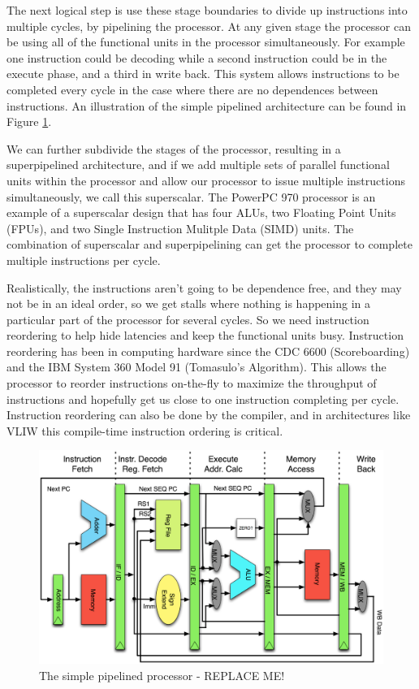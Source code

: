 \documentclass[12pt,twoside,letterpaper]{article}
\begin{document}
The next logical step is use these stage boundaries to divide up instructions into multiple cycles, by pipelining the processor. At any given stage the processor can be using all of the functional units in the processor simultaneously. For example one instruction could be decoding while a second instruction could be in the execute phase, and a third in write back. This system allows instructions to be completed every cycle in the case where there are no dependences between instructions. An illustration of the simple pipelined architecture can be found in Figure \ref{mips_pipeline}.

We can further subdivide the stages of the processor, resulting in a superpipelined architecture, and if we add multiple sets of parallel functional units within the processor and allow our processor to issue multiple instructions simultaneously, we call this superscalar. The PowerPC 970 processor is an example of a superscalar design that has four ALUs, two Floating Point Units (FPUs), and two Single Instruction Mulitple Data (SIMD) units. The combination of superscalar and superpipelining can get the processor to complete multiple instructions per cycle.

Realistically, the instructions aren't going to be dependence free, and they may not be in an ideal order, so we get stalls where nothing is happening in a particular part of the processor for several cycles. So we need instruction reordering to help hide latencies and keep the functional units busy. Instruction reordering has been in computing hardware since the CDC 6600 (Scoreboarding) and the IBM System 360 Model 91 (Tomasulo's Algorithm). This allows the processor to reorder instructions on-the-fly to maximize the throughput of instructions and hopefully get us close to one instruction completing per cycle. Instruction reordering can also be done by the compiler, and in architectures like VLIW this compile-time instruction ordering is critical.

\begin{figure}
	\begin{center}
		\includegraphics[scale=.15]{pipeline_MIPS.eps}
	\end{center}
	
	\caption{The simple pipelined processor - REPLACE ME!}
	\label{mips_pipeline}
\end{figure}
\end{document}
